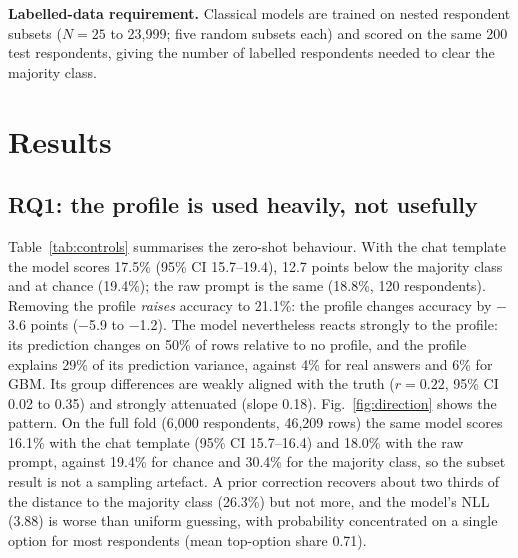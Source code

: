 \documentclass[conference]{IEEEtran}
\begin{document}
\textbf{Labelled-data requirement.} Classical models are trained on nested respondent subsets ($N=25$ to 23{,}999; five random subsets each) and scored on the same 200 test respondents, giving the number of labelled respondents needed to clear the majority class.

\section{Results}

\subsection{RQ1: the profile is used heavily, not usefully}

\begin{table}[!t]
\caption{Pew, 200 held-out respondents (1{,}548 rows; the direction and variance columns exclude one non-ordinal item, 1{,}351 rows and 182 cells). Dir.\ $r$: correlation between predicted and true group differences. Profile var.: share of variance explained by the profile beyond item effects.}
\label{tab:controls}
\centering
\scriptsize

\end{table}

Table~\ref{tab:controls} summarises the zero-shot behaviour. With the chat template the model scores 17.5\% (95\% CI 15.7--19.4), 12.7 points below the majority class and at chance (19.4\%); the raw prompt is the same (18.8\%, 120 respondents). Removing the profile \emph{raises} accuracy to 21.1\%: the profile changes accuracy by $-$3.6 points ($-$5.9 to $-$1.2). The model nevertheless reacts strongly to the profile: its prediction changes on 50\% of rows relative to no profile, and the profile explains 29\% of its prediction variance, against 4\% for real answers and 6\% for GBM. Its group differences are weakly aligned with the truth ($r={0.22}$, 95\% CI 0.02 to 0.35) and strongly attenuated (slope 0.18). Fig.~\ref{fig:direction} shows the pattern. On the full fold (6{,}000 respondents, 46{,}209 rows) the same model scores 16.1\% with the chat template (95\% CI 15.7--16.4) and 18.0\% with the raw prompt, against 19.4\% for chance and 30.4\% for the majority class, so the subset result is not a sampling artefact. A prior correction recovers about two thirds of the distance to the majority class (26.3\%) but not more, and the model's NLL (3.88) is worse than uniform guessing, with probability concentrated on a single option for most respondents (mean top-option share 0.71).
\end{document}
